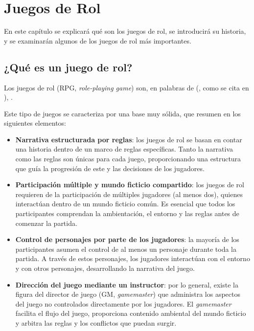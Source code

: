 \chapter{Juegos de Rol}
\label{cap:juegosrol}

\begin{resumen}
En este capítulo se explicará qué son los juegos de rol, se introducirá su historia, y se examinarán algunos de los juegos de rol más importantes.
\end{resumen}

\section{¿Qué es un juego de rol?}
Los juegos de rol (RPG, \textit{role-playing game}) son, en palabras de \citeauthor{LortzRPG} (\citeyear{LortzRPG}, como se cita en \cite{FineRPG}), . 

\medskip

Este tipo de juegos se caracteriza por una base muy sólida, que \cite{TychsenRPG} resumen en los siguientes elementos:

\begin{itemize}
	\item \textbf{Narrativa estructurada por reglas}: los juegos de rol se basan en contar una historia dentro de un marco de reglas específicas. Tanto la narrativa como las reglas son únicas para cada juego, proporcionando una estructura que guía la progresión de este y las decisiones de los jugadores.
	\item \textbf{Participación múltiple y mundo ficticio compartido}: los juegos de rol requieren de la participación de múltiples jugadores (al menos dos), quienes interactúan dentro de un mundo ficticio común. Es esencial que todos los participantes comprendan la ambientación, el entorno y las reglas antes de comenzar la partida.
	\item \textbf{Control de personajes por parte de los jugadores}: la mayoría de los participantes asumen el control de al menos un personaje durante toda la partida. A través de estos personajes, los jugadores interactúan con el entorno y con otros personajes, desarrollando la narrativa del juego.
	\item \textbf{Dirección del juego mediante un instructor}: por lo general, existe la figura del director de juego (GM, \textit{gamemaster}) que administra los aspectos del juego no controlados directamente por los jugadores. El \textit{gamemaster} facilita el flujo del juego, proporciona contenido ambiental del mundo ficticio y arbitra las reglas y los conflictos que puedan surgir.
\end{itemize}


